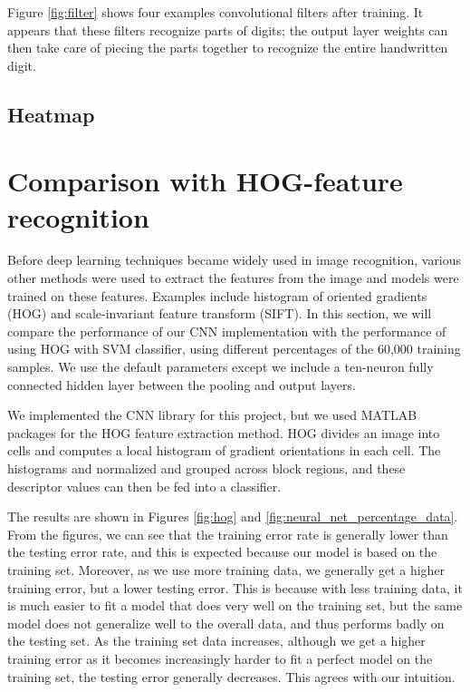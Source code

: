 \documentclass[10pt,twocolumn]{article}
\begin{document}
Figure \ref{fig:filter} shows four examples convolutional filters after training. It appears that these filters recognize parts of digits; the output layer weights can then take care of piecing the parts together to recognize the entire handwritten digit.

\subsection{Heatmap}

\section{Comparison with HOG-feature recognition} \label{sec:evalfeature}

Before deep learning techniques became widely used in image recognition, various other methods were used to extract the features from the image and models were trained on these features. Examples include histogram of oriented gradients (HOG) and scale-invariant feature transform (SIFT). In this section, we will compare the performance of our CNN implementation with the performance of using HOG with SVM classifier, using different percentages of the 60,000 training samples. We use the default parameters except we include a ten-neuron fully connected hidden layer between the pooling and output layers.

We implemented the CNN library for this project, but we used MATLAB packages for the HOG feature extraction method. HOG divides an image into cells and computes a local histogram of gradient orientations in each cell. The histograms and normalized and grouped across block regions, and these descriptor values can then be fed into a classifier.

The results are shown in Figures \ref{fig:hog} and \ref{fig:neural_net_percentage_data}. From the figures, we can see that the training error rate is generally lower than the testing error rate, and this is expected because our model is based on the training set. Moreover, as we use more training data, we generally get a higher training error, but a lower testing error. This is because with less training data, it is much easier to fit a model that does very well on the training set, but the same model does not generalize well to the overall data, and thus performs badly on the testing set. As the training set data increases, although we get a higher training error as it becomes increasingly harder to fit a perfect model on the training set, the testing error generally decreases. This agrees with our intuition.
\end{document}
